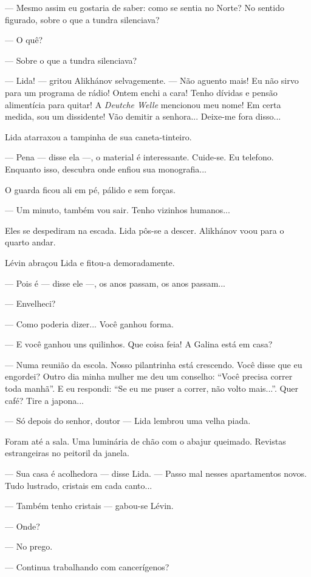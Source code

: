 --- Mesmo assim eu gostaria de saber: como se sentia no Norte? No
sentido figurado, sobre o que a tundra silenciava?

--- O quê?

--- Sobre o que a tundra silenciava?

--- Lida! --- gritou Alikhánov selvagemente. --- Não aguento mais! Eu
não sirvo para um programa de rádio! Ontem enchi a cara! Tenho dívidas e
pensão alimentícia para quitar! A \emph{Deutche Welle} mencionou meu
nome! Em certa medida, sou um dissidente! Vão demitir a senhora...
Deixe-me fora disso...

Lida atarraxou a tampinha de sua caneta-tinteiro.

--- Pena --- disse ela ---, o material é interessante. Cuide-se. Eu
telefono. Enquanto isso, descubra onde enfiou sua monografia...

O guarda ficou ali em pé, pálido e sem forças.

--- Um minuto, também vou sair. Tenho vizinhos humanos...

Eles se despediram na escada. Lida pôs-se a descer. Alikhánov voou para
o quarto andar.

Lévin abraçou Lida e fitou-a demoradamente.

--- Pois é --- disse ele ---, os anos passam, os anos passam...

--- Envelheci?

--- Como poderia dizer... Você ganhou forma.

--- E você ganhou uns quilinhos. Que coisa feia! A Galina está em casa?

--- Numa reunião da escola. Nosso pilantrinha está crescendo. Você disse
que eu engordei? Outro dia minha mulher me deu um conselho: ``Você
precisa correr toda manhã''. E eu respondi: ``Se eu me puser a correr,
não volto mais...''. Quer café? Tire a japona...

--- Só depois do senhor, doutor --- Lida lembrou uma velha piada.

Foram até a sala. Uma luminária de chão com o abajur queimado. Revistas
estrangeiras no peitoril da janela.

--- Sua casa é acolhedora --- disse Lida. --- Passo mal nesses
apartamentos novos. Tudo lustrado, cristais em cada canto...

--- Também tenho cristais --- gabou-se Lévin.

--- Onde?

--- No prego.

--- Continua trabalhando com cancerígenos?

